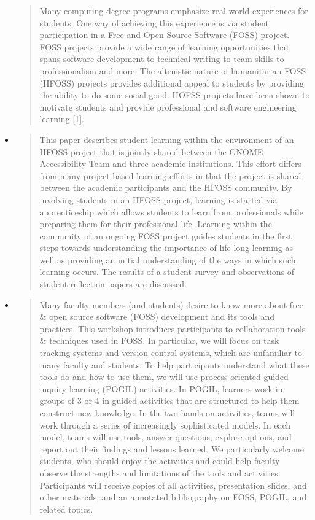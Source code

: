 \documentclass[11pt]{article}
\begin{document}
\begin{itemize}
\begin{quote}
Many computing degree programs emphasize real-world experiences for students. One way of achieving this experience is via student participation in a Free and Open Source Software (FOSS) project. FOSS projects provide a wide range of learning opportunities that spans software development to technical writing to team skills to professionalism and more. The altruistic nature of humanitarian FOSS (HFOSS) projects provides additional appeal to students by providing the ability to do some social good. HOFSS projects have been shown to motivate students and provide professional and software engineering learning [1].
\end{quote}

\item \cite{Ellis:2014a}

\begin{quote}
This paper describes student learning within the environment of an HFOSS project that is jointly shared between the GNOME Accessibility Team and three academic institutions. This effort differs from many project-based learning efforts in that the project is shared between the academic participants and the HFOSS community. By involving students in an HFOSS project, learning is started via apprenticeship which allows students to learn from professionals while preparing them for their professional life. Learning within the community of an ongoing FOSS project guides students in the first steps towards understanding the importance of life-long learning as well as providing an initial understanding of the ways in which such learning occurs. The results of a student survey and observations of student reflection papers are discussed.
\end{quote}

\item \cite{Kussmaul:2012}

\begin{quote}
Many faculty members (and students) desire to know more about free \& open source software (FOSS) development and its tools and practices. This workshop introduces participants to collaboration tools \& techniques used in FOSS. In particular, we will focus on task tracking systems and version control systems, which are unfamiliar to many faculty and students. To help participants understand what these tools do and how to use them, we will use process oriented guided inquiry learning (POGIL) activities. In POGIL, learners work in groups of 3 or 4 in guided activities that are structured to help them construct new knowledge. In the two hands-on activities, teams will work through a series of increasingly sophisticated models. In each model, teams will use tools, answer questions, explore options, and report out their findings and lessons learned. We particularly welcome students, who should enjoy the activities and could help faculty observe the strengths and limitations of the tools and activities. Participants will receive copies of all activities, presentation slides, and other materials, and an annotated bibliography on FOSS, POGIL, and related topics.
\end{quote}


\end{itemize}
\end{document}
